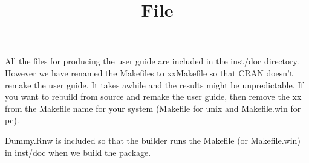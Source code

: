 \documentclass[12pt]{article}
\title{\Dummy File}
\begin{document}
All the files for producing the user guide are included in the inst/doc directory.  However we have renamed the Makefiles to xxMakefile so that CRAN doesn't remake the user guide.  It takes awhile and the results might be unpredictable.  If you want to rebuild from source and remake the user guide, then remove the xx from the Makefile name for your system (Makefile for unix and Makefile.win for pc).

Dummy.Rnw is included so that the builder runs the Makefile (or Makefile.win) in inst/doc when we build the package.  
\end{document}
